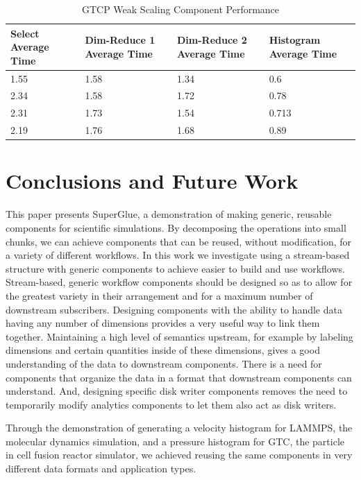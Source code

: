 \documentclass[conference]{IEEEtran}
\begin{document}
\begin{table}[tbp]
\vspace{-0.10in}
\centering
\caption{GTCP Weak Scaling Component Performance}
\label{tab:eval-weak-gtcp-2}
\vspace{-0.15in}
\begin{tabular}{|p{0.67 in}|p{0.67 in}|p{0.67 in}|p{0.65 in}|}
\hline
Select Average Time & Dim-Reduce 1 Average Time & Dim-Reduce 2 Average Time & Histogram Average Time\\
\hline
1.55 & 1.58 & 1.34 & 0.6\\
\hline
2.34 & 1.58 & 1.72 & 0.78\\
\hline
2.31 & 1.73 & 1.54 & 0.713\\
\hline
2.19 & 1.76 & 1.68 & 0.89\\
\hline
\end{tabular}
\vspace{-0.25in}
\end{table}

\section{Conclusions and Future Work}
\label{s:conclusion}

This paper presents SuperGlue, a demonstration of making generic, reusable
components for scientific simulations. By decomposing the operations into small
chunks, we can achieve components that can be reused, without modification, for
a variety of different workflows. In this work we investigate using a
stream-based structure with generic components to achieve easier to build and
use workflows.  Stream-based, generic workflow components should be designed so
as to allow for the greatest variety in their arrangement and for a maximum
number of downstream subscribers. Designing components with the ability to
handle data having any number of dimensions provides a very useful way to link
them together. Maintaining a high level of semantics upstream, for example by
labeling dimensions and certain quantities inside of these dimensions, gives a
good understanding of the data to downstream components. There is a need for
components that organize the data in a format that downstream components can
understand. And, designing specific disk writer components removes the need to
temporarily modify analytics components to let them also act as disk writers.

Through the demonstration of generating a velocity histogram for LAMMPS, the
molecular dynamics simulation, and a pressure histogram for GTC, the particle
in cell fusion reactor simulator, we achieved reusing the same components in
very different data formats and application types.
\end{document}
